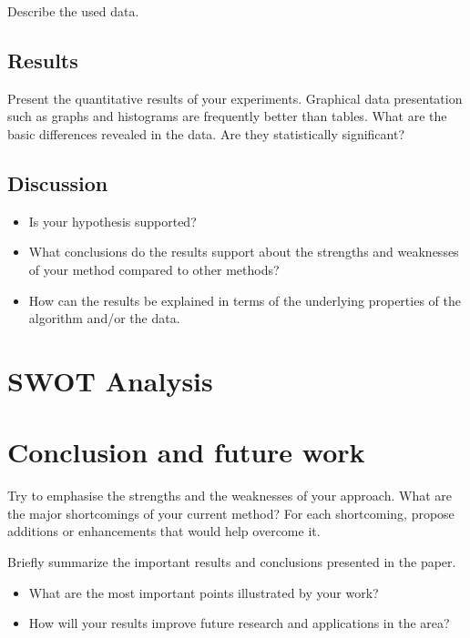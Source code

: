 \documentclass[runningheads,a4paper,11pt]{report}
\begin{document}
Describe the used data.

\section{Results}
\label{section:results}

Present the quantitative results of your experiments. Graphical data presentation such as graphs and histograms are frequently better than tables. What are the basic differences revealed in the data. Are they statistically significant?

\section{Discussion}
\label{section:discussion}

\begin{itemize}
	\item Is your hypothesis supported? 
	\item What conclusions do the results support about the strengths and weaknesses of your method compared to other methods? 
	\item How can the results be explained in terms of the underlying properties of the algorithm and/or the data. 
\end{itemize}


\chapter{SWOT Analysis}
\label{chapter:swot}


\chapter{Conclusion and future work}
\label{chapter:concl}

Try to emphasise the strengths and the weaknesses of your approach.
What are the major shortcomings of your current method? For each shortcoming, propose additions or enhancements that would help overcome it. 

Briefly summarize the important results and conclusions presented in the paper. 

\begin{itemize}
	\item What are the most important points illustrated by your work? 
	\item How will your results improve future research and applications in the area? 
\end{itemize}
\end{document}
